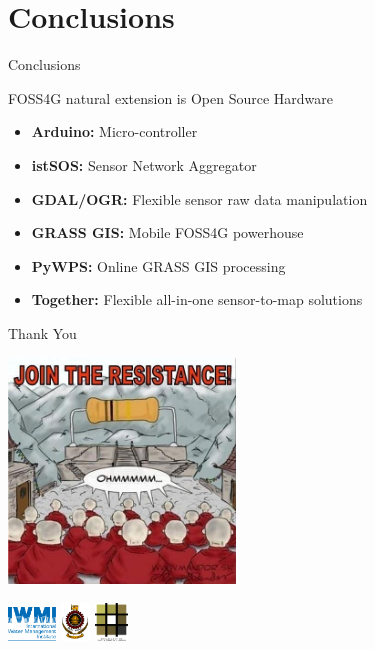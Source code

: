 \documentclass[xcolor=dvipsnames,beamer]{beamer} %
\begin{document}
\section{Conclusions}
\begin{frame}[fragile]{Conclusions}

\begin{block}{FOSS4G natural extension is Open Source Hardware}
\begin{itemize} 
 \item {\bf Arduino:} Micro-controller
 \item {\bf istSOS:} Sensor Network Aggregator
 \item {\bf GDAL/OGR:} Flexible sensor raw data manipulation
 \item {\bf GRASS GIS:} Mobile FOSS4G powerhouse
 \item {\bf PyWPS:} Online GRASS GIS processing 
 \item {\bf Together:} Flexible all-in-one sensor-to-map solutions
\end{itemize}
\end{block}

\end{frame}

\begin{frame}[fragile]{Thank You}

\begin{center}
 \includegraphics[height=6cm]{ohm}
\end{center}

\begin{flushright}
 \includegraphics[height=0.9cm]{iwmi}
 \hspace{5mm}
 \includegraphics[height=1cm]{uoMoratuwa}
 \hspace{5mm}
 \includegraphics[height=1cm]{uoMoratuwa_foa}
\end{flushright}

\end{frame}
\end{document}
